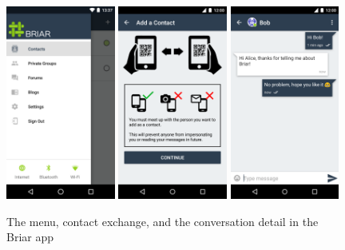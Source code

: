 \begin{figure}
    \centering
    \includegraphics[width=0.32\textwidth]{screens/briar/briar1}
    \includegraphics[width=0.32\textwidth]{screens/briar/contact}
    \includegraphics[width=0.32\textwidth]{screens/briar/briar2}
    \caption{The menu, contact exchange, and the conversation detail in the Briar app}
    \label{briar}
\end{figure}

